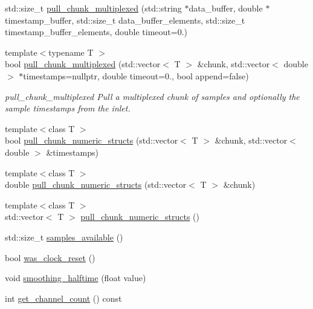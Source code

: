 \begin{DoxyCompactItemize}
\item 
std\+::size\+\_\+t \hyperlink{classlsl_1_1stream__inlet_a6a0f2f39152a2975571d5073d9967646}{pull\+\_\+chunk\+\_\+multiplexed} (std\+::string $\ast$data\+\_\+buffer, double $\ast$timestamp\+\_\+buffer, std\+::size\+\_\+t data\+\_\+buffer\+\_\+elements, std\+::size\+\_\+t timestamp\+\_\+buffer\+\_\+elements, double timeout=0.)
\item 
{\footnotesize template$<$typename T $>$ }\\bool \hyperlink{classlsl_1_1stream__inlet_a9ac87825319b345987fdd54e606fd56f}{pull\+\_\+chunk\+\_\+multiplexed} (std\+::vector$<$ T $>$ \&chunk, std\+::vector$<$ double $>$ $\ast$timestamps=nullptr, double timeout=0., bool append=false)
\begin{DoxyCompactList}\small\item\em pull\+\_\+chunk\+\_\+multiplexed Pull a multiplexed chunk of samples and optionally the sample timestamps from the inlet. \end{DoxyCompactList}\item 
{\footnotesize template$<$class T $>$ }\\bool \hyperlink{classlsl_1_1stream__inlet_a018caadb9a2c61f0c1c6388f7b617008}{pull\+\_\+chunk\+\_\+numeric\+\_\+structs} (std\+::vector$<$ T $>$ \&chunk, std\+::vector$<$ double $>$ \&timestamps)
\item 
{\footnotesize template$<$class T $>$ }\\double \hyperlink{classlsl_1_1stream__inlet_ab14a0120e49dcd33f6df0716e6606810}{pull\+\_\+chunk\+\_\+numeric\+\_\+structs} (std\+::vector$<$ T $>$ \&chunk)
\item 
{\footnotesize template$<$class T $>$ }\\std\+::vector$<$ T $>$ \hyperlink{classlsl_1_1stream__inlet_a4a743ed5df78b05dcc038e73a1d4fb9b}{pull\+\_\+chunk\+\_\+numeric\+\_\+structs} ()
\item 
std\+::size\+\_\+t \hyperlink{classlsl_1_1stream__inlet_a8a4f5ff87d40a696ab4a5d74c03cd52b}{samples\+\_\+available} ()
\item 
bool \hyperlink{classlsl_1_1stream__inlet_ac3b8fa8912090ad6607b05cbb5848352}{was\+\_\+clock\+\_\+reset} ()
\item 
void \hyperlink{classlsl_1_1stream__inlet_a2774c1dbcf3fc7b17505e8814921d17c}{smoothing\+\_\+halftime} (float value)
\item 
int \hyperlink{classlsl_1_1stream__inlet_ad86702cf94e5b0b850a2f94a228e4f98}{get\+\_\+channel\+\_\+count} () const
\end{DoxyCompactItemize}


